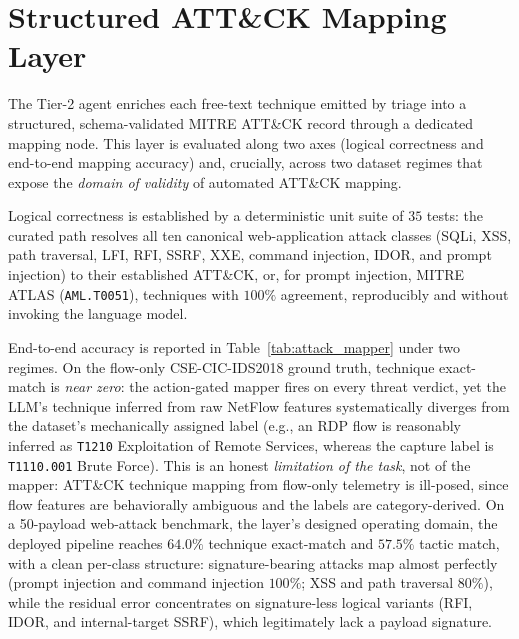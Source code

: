 \section{Structured ATT\&CK Mapping Layer}
The Tier-2 agent enriches each free-text technique emitted by triage into a structured, schema-validated MITRE ATT\&CK record through a dedicated mapping node. This layer is evaluated along two axes (logical correctness and end-to-end mapping accuracy) and, crucially, across two dataset regimes that expose the \emph{domain of validity} of automated ATT\&CK mapping.

Logical correctness is established by a deterministic unit suite of $35$ tests: the curated path resolves all ten canonical web-application attack classes (SQLi, XSS, path traversal, LFI, RFI, SSRF, XXE, command injection, IDOR, and prompt injection) to their established ATT\&CK, or, for prompt injection, MITRE ATLAS (\texttt{AML.T0051}), techniques with $100\%$ agreement, reproducibly and without invoking the language model.

End-to-end accuracy is reported in Table~\ref{tab:attack_mapper} under two regimes. On the flow-only CSE-CIC-IDS2018 ground truth, technique exact-match is \emph{near zero}: the action-gated mapper fires on every threat verdict, yet the LLM's technique inferred from raw NetFlow features systematically diverges from the dataset's mechanically assigned label (e.g., an RDP flow is reasonably inferred as \texttt{T1210} Exploitation of Remote Services, whereas the capture label is \texttt{T1110.001} Brute Force). This is an honest \emph{limitation of the task}, not of the mapper: ATT\&CK technique mapping from flow-only telemetry is ill-posed, since flow features are behaviorally ambiguous and the labels are category-derived. On a 50-payload web-attack benchmark, the layer's designed operating domain, the deployed pipeline reaches $64.0\%$ technique exact-match and $57.5\%$ tactic match, with a clean per-class structure: signature-bearing attacks map almost perfectly (prompt injection and command injection $100\%$; XSS and path traversal $80\%$), while the residual error concentrates on signature-less logical variants (RFI, IDOR, and internal-target SSRF), which legitimately lack a payload signature.

